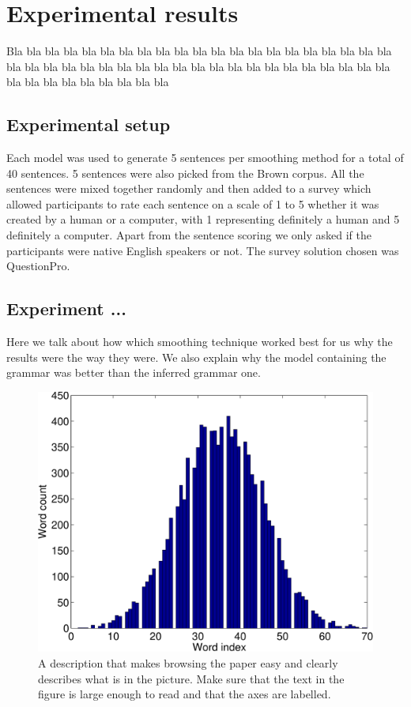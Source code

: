 \documentclass[a4paper,12pt]{article}
\begin{document}
  

\section{Experimental results}
\label{sec:exps}

Bla bla bla bla bla bla bla bla bla bla bla bla bla bla bla bla bla 
bla bla bla bla bla bla bla bla bla bla bla bla bla bla bla bla bla 
bla bla bla bla bla bla bla bla bla bla bla bla bla bla bla bla bla 

\subsection{Experimental setup}
Each model was used to generate 5 sentences per smoothing method for a total of 40 sentences. 5 sentences were also picked from the Brown corpus. All the sentences were mixed together randomly and then added to a survey which allowed participants to rate each sentence on a scale of 1 to 5 whether it was created by a human or a computer, with 1 representing definitely a human and 5 definitely a computer. Apart from the sentence scoring we only asked if the participants were native English speakers or not. The survey solution chosen was QuestionPro.

\subsection{Experiment ...}

Here we talk about how which smoothing technique worked best for us why the results were the way they were. We also explain why the model containing the grammar was better than the inferred grammar one. 

\begin{figure}
\centering
\includegraphics[width=0.8\linewidth]{histogram}
\caption{A description that makes browsing the paper easy and clearly 
describes what is in the picture. Make sure that the text in the figure 
is large enough to read and that the axes are labelled.}
\label{fig:histogram}
\end{figure}
\end{document}

